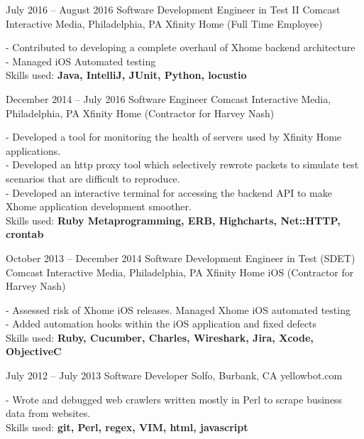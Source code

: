 \documentclass[oldfontcommands]{tccv}
\begin{document}
\begin{eventlist}

\item{July 2016 -- August 2016}
     {Software Development Engineer in Test II}
     {Comcast Interactive Media, Philadelphia, PA}
     {Xfinity Home (Full Time Employee)}

- Contributed to developing a complete overhaul of Xhome backend architecture \\
- Managed iOS Automated testing \\
Skills used: \textbf{Java, IntelliJ, JUnit, Python, locustio}

\item{December 2014 -- July 2016}
     {Software Engineer}
     {Comcast Interactive Media, Philadelphia, PA}
     {Xfinity Home (Contractor for Harvey Nash)}

- Developed a tool for monitoring the health of servers used by Xfinity Home applications. \\
- Developed an http proxy tool which selectively rewrote packets to simulate test scenarios that are difficult to reproduce. \\
- Developed an interactive terminal for accessing the backend API to make Xhome application development smoother. \\
Skills used: \textbf{Ruby Metaprogramming, ERB, Highcharts, Net::HTTP, crontab}

\item{October 2013 -- December 2014}
     {Software Development Engineer in Test (SDET)}
     {Comcast Interactive Media, Philadelphia, PA}
     {Xfinity Home iOS (Contractor for Harvey Nash)}

- Assessed risk of Xhome iOS releases. Managed Xhome iOS automated testing \\
- Added automation hooks within the iOS application and fixed defects \\
Skills used: \textbf{Ruby, Cucumber, Charles, Wireshark, Jira, Xcode, ObjectiveC}

\item{July 2012 -- July 2013}
     {Software Developer}
     {Solfo, Burbank, CA}
     {yellowbot.com}

- Wrote and debugged web crawlers written mostly in Perl to scrape business data from websites. \\
Skills used: \textbf{git, Perl, regex, VIM, html, javascript}

\end{eventlist}
\end{document}

